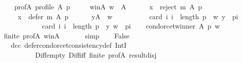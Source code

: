 \begin{isabellebody}
\ \ \ \ prof{\isacharunderscore}{\kern0pt}A{\isacharcolon}{\kern0pt}\ {\isachardoublequoteopen}profile\ A\ p{\isachardoublequoteclose}\ \isanewline
\ \ \ \ w{\isacharunderscore}{\kern0pt}in{\isacharunderscore}{\kern0pt}A{\isacharcolon}{\kern0pt}\ {\isachardoublequoteopen}w\ {\isasymin}\ A{\isachardoublequoteclose}\ \isanewline
\ \ \ \ {}{\isacharcolon}{\kern0pt}\ {\isachardoublequoteopen}x\ {\isasymin}\ reject\ m\ A\ p{\isachardoublequoteclose}\ \isanewline
\ \ \ \ {}{\isacharcolon}{\kern0pt}\ {\isachardoublequoteopen}x\ {\isasymin}\ defer\ m\ A\ p{\isachardoublequoteclose}\ \isanewline
\ \ \ \ {}{\isacharcolon}{\kern0pt}\ {\isachardoublequoteopen}{\isasymforall}y{\isasymin}A\ {\isacharminus}{\kern0pt}\ {\isacharbraceleft}{\kern0pt}w{\isacharbraceright}{\kern0pt}{\isachardot}{\kern0pt}\isanewline
\ \ \ \ \ \ \ \ \ \ card\ {\isacharbraceleft}{\kern0pt}i{\isachardot}{\kern0pt}\ i\ {\isacharless}{\kern0pt}\ length\ p\ {\isasymand}\ {\isacharparenleft}{\kern0pt}w{\isacharcomma}{\kern0pt}\ y{\isacharparenright}{\kern0pt}\ {\isasymin}\ {\isacharparenleft}{\kern0pt}p{\isacharbang}{\kern0pt}i{\isacharparenright}{\kern0pt}{\isacharbraceright}{\kern0pt}\ {\isacharless}{\kern0pt}\isanewline
\ \ \ \ \ \ \ \ \ \ \ \ card\ {\isacharbraceleft}{\kern0pt}i{\isachardot}{\kern0pt}\ i\ {\isacharless}{\kern0pt}\ length\ p\ {\isasymand}\ {\isacharparenleft}{\kern0pt}y{\isacharcomma}{\kern0pt}\ w{\isacharparenright}{\kern0pt}\ {\isasymin}\ {\isacharparenleft}{\kern0pt}p{\isacharbang}{\kern0pt}i{\isacharparenright}{\kern0pt}{\isacharbraceright}{\kern0pt}{\isachardoublequoteclose}\isanewline
\ \ \isamarkupfalse%
\ {\isachardoublequoteopen}condorcet{\isacharunderscore}{\kern0pt}winner\ A\ p\ w{\isachardoublequoteclose}\isanewline
\ \ \ \ \isamarkupfalse%
\ finite\ prof{\isacharunderscore}{\kern0pt}A\ w{\isacharunderscore}{\kern0pt}in{\isacharunderscore}{\kern0pt}A\ {\isachardoublequoteopen}{}{\isachardoublequoteclose}\isanewline
\ \ \ \ \isamarkupfalse%
\ simp\isanewline
\ \ \isamarkupfalse%
\ {\isachardoublequoteopen}False{\isachardoublequoteclose}\isanewline
\ \ \ \ \isamarkupfalse%
\ {\isachardoublequoteopen}{}{\isachardoublequoteclose}\ {\isachardoublequoteopen}{}{\isachardoublequoteclose}\ dcc\ defer{\isacharunderscore}{\kern0pt}condorcet{\isacharunderscore}{\kern0pt}consistency{\isacharunderscore}{\kern0pt}def\ IntI\isanewline
\ \ \ \ \ \ \ \ \ \ Diff{\isacharunderscore}{\kern0pt}empty\ Diff{\isacharunderscore}{\kern0pt}iff\ finite\ prof{\isacharunderscore}{\kern0pt}A\ result{\isacharunderscore}{\kern0pt}disj\isanewline

\end{isabellebody}
